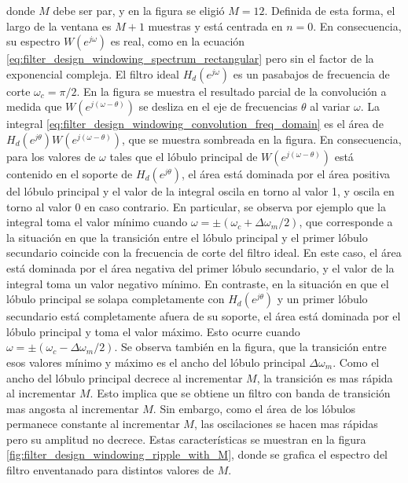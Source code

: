 \documentclass[a4paper]{report}
\begin{document}
donde \(M\) debe ser par, y en la figura se eligió \(M=12\). Definida de esta forma, el largo de la ventana es \(M+1\) muestras y está centrada en \(n=0\). En consecuencia, su espectro \(W(e^{j\omega})\) es real, como en la ecuación \ref{eq:filter_design_windowing_spectrum_rectangular} pero sin el factor de la exponencial compleja. El filtro ideal \(H_d(e^{j\omega})\) es un pasabajos de frecuencia de corte \(\omega_c=\pi/2\). En la figura se muestra el resultado parcial de la convolución a medida que \(W(e^{j(\omega-\theta)})\) se desliza en el eje de frecuencias \(\theta\) al variar \(\omega\). La integral \ref{eq:filter_design_windowing_convolution_freq_domain} es el área de \(H_d(e^{j\theta})W(e^{j(\omega-\theta)})\), que se muestra sombreada en la figura. En consecuencia, para los valores de \(\omega\) tales que el lóbulo principal de \(W(e^{j(\omega-\theta)})\) está contenido en el soporte de \(H_d(e^{j\theta})\), el área está dominada por el área positiva del lóbulo principal y el valor de la integral oscila en torno al valor 1, y oscila en torno al valor 0 en caso contrario. En particular, se observa por ejemplo que la integral toma el valor mínimo cuando \(\omega=\pm(\omega_c+\Delta\omega_m/2)\), que corresponde a la situación en que la transición entre el lóbulo principal y el primer lóbulo secundario coincide con la frecuencia de corte del filtro ideal. En este caso, el área está dominada por el área negativa del primer lóbulo secundario, y el valor de la integral toma un valor negativo mínimo. En contraste, en la situación en que el lóbulo principal se solapa completamente con \(H_d(e^{j\theta})\) y un primer lóbulo secundario está completamente afuera de su soporte, el área está dominada por el lóbulo principal y toma el valor máximo. Esto ocurre cuando \(\omega=\pm(\omega_c-\Delta\omega_m/2)\). Se observa también en la figura, que la transición entre esos valores mínimo y máximo es el ancho del lóbulo principal \(\Delta\omega_m\). Como el ancho del lóbulo principal decrece al incrementar \(M\), la transición es mas rápida al incrementar \(M\). Esto implica que se obtiene un filtro con banda de transición mas angosta al incrementar \(M\). Sin embargo, como el área de los lóbulos permanece constante al incrementar \(M\), las oscilaciones se hacen mas rápidas pero su amplitud no decrece. Estas características se muestran en la figura \ref{fig:filter_design_windowing_ripple_with_M}, donde se grafica el espectro del filtro enventanado para distintos valores de \(M\).
\end{document}
